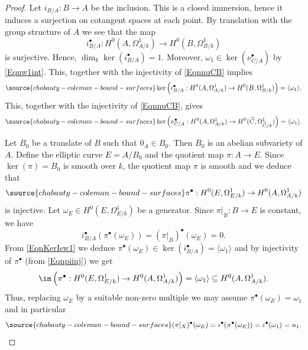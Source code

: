 \begin{proof}
Let $i_{B/A}:B\to A$ be the inclusion. This is a closed immersion, hence it induces a surjection on cotangent spaces at each point. By translation with the group structure of $A$ we see that the map
$$
i_{B/A}^\bullet : H^0(A,\Omega^1_{A/k})\to H^0(B,\Omega^1_{B/k})
$$
is surjective. Hence, $\dim_k \ker(i_{B/A}^\bullet) = 1$. Moreover, $\omega_1\in\ker (\nu_{C/A}^\bullet)$ by \eqref{Eqnw1int}. This, together with the injectivity of \eqref{EqnnuCB} implies
\begin{equation}\label{EqnKerIsw1}
\source{chabauty-coleman-bound-surfaces}
\ker \left(i_{B/A}^\bullet:H^0(A,\Omega^1_{A/k})\to H^0(B,\Omega^1_{B/k})\right) =\langle \omega_1\rangle.
\end{equation}
This, together with the injectivity of \eqref{EqnnuCB}, gives
\begin{equation}\label{EqnKerCA}
\source{chabauty-coleman-bound-surfaces}
\ker \left(\nu_{C/A}^\bullet:H^0(A,\Omega^1_{A/k})\to H^0(\widetilde{C},\Omega^1_{\widetilde{C}/k})\right) =\langle \omega_1\rangle.
\end{equation}


Let $B_0$ be a translate of $B$ such that $0_A\in B_0$. Then $B_0$ is an abelian subvariety of $A$. Define the elliptic curve $E=A/B_0$ and the quotient map $\pi:A\to E$. Since $\ker(\pi)=B_0$ is smooth over $k$, the quotient map $\pi$ is smooth and we deduce that
\begin{equation}\label{Eqnpiinj}
\source{chabauty-coleman-bound-surfaces}
\pi^\bullet: H^0(E,\Omega^1_{E/k})\to H^0(A,\Omega^1_{A/k})
\end{equation}
is injective. Let $\omega_E\in H^0(E,\Omega^1_{E/k})$ be a generator. Since $\pi|_B:B\to E$ is constant, we have
$$
i_{B/A}^\bullet(\pi^\bullet(\omega_E))=(\pi|_B)^\bullet(\omega_E)=0.
$$
From \eqref{EqnKerIsw1} we deduce  $\pi^\bullet(\omega_E)\in \ker(i_{B/A}^\bullet)=\langle \omega_1\rangle$ and by injectivity of $\pi^\bullet$ (from \eqref{Eqnpiinj}) we get
$$
\im\left(\pi^\bullet:H^0(E,\Omega^1_{E/k})\to H^0(A,\Omega^1_{A/k})\right)=\langle\omega_1\rangle\subseteq H^0(A,\Omega^1_{A/k}).
$$
Thus, replacing $\omega_E$ by a suitable non-zero multiple we may assume $\pi^\bullet(\omega_E)=\omega_1$ and in particular
\begin{equation}\label{EqnwE}
\source{chabauty-coleman-bound-surfaces}
(\pi|_X)^\bullet(\omega_E)=\iota^\bullet(\pi^\bullet(\omega_E))=\iota^\bullet(\omega_1)=u_1.
\end{equation}




\end{proof}
